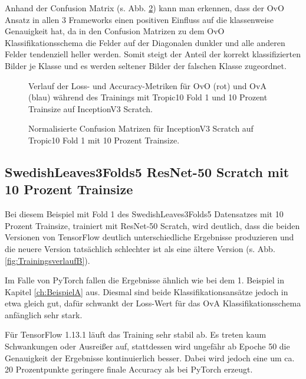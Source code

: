 Anhand der Confusion Matrix (s. Abb. \ref{fig:ConfusionMatrixA}) kann man erkennen, dass der OvO Ansatz in allen 3 Frameworks einen positiven Einfluss auf die klassenweise Genauigkeit hat, da in den Confusion Matrizen zu dem OvO Klassifikationsschema die Felder auf der Diagonalen dunkler und alle anderen Felder tendenziell heller werden. Somit steigt der Anteil der korrekt klassifizierten Bilder je Klasse und es werden seltener Bilder der falschen Klasse zugeordnet.
\begin{figure}[H]
\begin{adjustbox}{width=1.4\textwidth, center}

\end{adjustbox}
\caption{Verlauf der Loss- und Accuracy-Metriken für OvO (rot) und OvA (blau) während des Trainings mit Tropic10 Fold 1 und 10 Prozent Trainsize auf InceptionV3 Scratch.}
\label{fig:TrainingsverlaufA}
\end{figure}

\begin{figure}[H]
\begin{adjustbox}{width=1.1\textwidth, center}

\end{adjustbox}
\caption{Normalisierte Confusion Matrizen für InceptionV3 Scratch auf Tropic10 Fold 1 mit 10 Prozent Trainsize.}
\label{fig:ConfusionMatrixA}
\end{figure}

\subsection{SwedishLeaves3Folds5 ResNet-50 Scratch mit 10 Prozent Trainsize}
\label{ch:BeispielB}
Bei diesem Beispiel mit Fold 1 des SwedishLeaves3Folds5 Datensatzes mit 10 Prozent Trainsize, trainiert mit ResNet-50 Scratch, wird deutlich, dass die beiden Versionen von TensorFlow \cite{tensorflow} deutlich unterschiedliche Ergebnisse produzieren und die neuere Version tatsächlich schlechter ist als eine ältere Version (s. Abb. \ref{fig:TrainingsverlaufB}).

Im Falle von PyTorch \cite{pytorch} fallen die Ergebnisse ähnlich wie bei dem 1. Beispiel in Kapitel \ref{ch:BeispielA} aus. Diesmal sind beide Klassifikationsansätze jedoch in etwa gleich gut, dafür schwankt der Loss-Wert für das OvA Klassifikationsschema anfänglich sehr stark.

Für TensorFlow 1.13.1 \cite{tensorflow} läuft das Training sehr stabil ab. Es treten kaum Schwankungen oder Ausreißer auf, stattdessen wird ungefähr ab Epoche 50 die Genauigkeit der Ergebnisse kontinuierlich besser. Dabei wird jedoch eine um ca. 20 Prozentpunkte geringere finale Accuracy als bei PyTorch \cite{pytorch} erzeugt.

